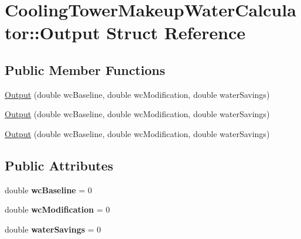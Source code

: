 \hypertarget{struct_cooling_tower_makeup_water_calculator_1_1_output}{}\section{Cooling\+Tower\+Makeup\+Water\+Calculator\+:\+:Output Struct Reference}
\label{struct_cooling_tower_makeup_water_calculator_1_1_output}
\subsection*{Public Member Functions}
\begin{DoxyCompactItemize}
\item 
\hyperlink{struct_cooling_tower_makeup_water_calculator_1_1_output_a9eb90f4944a1fc99fcbb3ad6906e8fc3}{Output} (double wc\+Baseline, double wc\+Modification, double water\+Savings)
\item 
\hyperlink{struct_cooling_tower_makeup_water_calculator_1_1_output_a9eb90f4944a1fc99fcbb3ad6906e8fc3}{Output} (double wc\+Baseline, double wc\+Modification, double water\+Savings)
\item 
\hyperlink{struct_cooling_tower_makeup_water_calculator_1_1_output_a9eb90f4944a1fc99fcbb3ad6906e8fc3}{Output} (double wc\+Baseline, double wc\+Modification, double water\+Savings)
\end{DoxyCompactItemize}
\subsection*{Public Attributes}
\begin{DoxyCompactItemize}
\item 
\mbox{\label{struct_cooling_tower_makeup_water_calculator_1_1_output_a07a8b5e30ba99d4adc9e8dbb933b3c8e}} 
double {\bfseries wc\+Baseline} = 0
\item 
\mbox{\label{struct_cooling_tower_makeup_water_calculator_1_1_output_aca55471d0ab8d495bf0942c4e401ca9e}} 
double {\bfseries wc\+Modification} = 0
\item 
\mbox{\label{struct_cooling_tower_makeup_water_calculator_1_1_output_ab96b76ea8aa1660bbeadeecc30a95a59}} 
double {\bfseries water\+Savings} = 0
\end{DoxyCompactItemize}


